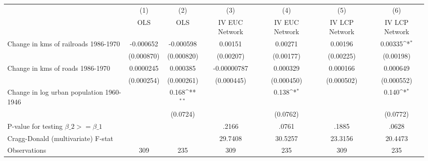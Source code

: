 {
\def\sym#1{\ifmmode^{#1}\else\(^{#1}\)\fi}
\begin{tabular}{l*{6}{c}}
\hline\hline
                &\multicolumn{1}{c}{(1)}&\multicolumn{1}{c}{(2)}&\multicolumn{1}{c}{(3)}&\multicolumn{1}{c}{(4)}&\multicolumn{1}{c}{(5)}&\multicolumn{1}{c}{(6)}\\
                &\multicolumn{1}{c}{OLS}&\multicolumn{1}{c}{OLS}&\multicolumn{1}{c}{IV EUC Network}&\multicolumn{1}{c}{IV EUC Network}&\multicolumn{1}{c}{IV LCP Network}&\multicolumn{1}{c}{IV LCP Network}\\
\hline
Change in kms of railroads 1986-1970&-0.000652         &-0.000598         &  0.00151         &  0.00271         &  0.00196         &  0.00335\sym{*}  \\
                &(0.000870)         &(0.000820)         &(0.00207)         &(0.00177)         &(0.00225)         &(0.00198)         \\
[1em]
Change in kms of roads 1986-1970&0.0000245         & 0.000385         &-0.00000787         & 0.000329         & 0.000166         & 0.000649         \\
                &(0.000254)         &(0.000261)         &(0.000445)         &(0.000450)         &(0.000502)         &(0.000552)         \\
[1em]
Change in log urban population 1960-1946&                  &    0.168\sym{**} &                  &    0.138\sym{*}  &                  &    0.140\sym{*}  \\
                &                  & (0.0724)         &                  & (0.0762)         &                  & (0.0772)         \\
\hline
P-value for testing $\beta\_{2} >= \beta\_{1}$&                  &                  &    .2166         &    .0761         &    .1885         &    .0628         \\
Cragg-Donald (multivariate) F-stat&                  &                  &  29.7408         &  30.5257         &  23.3156         &  20.4473         \\
Observations    &      309         &      235         &      309         &      235         &      309         &      235         \\
\hline\hline
\end{tabular}
}
